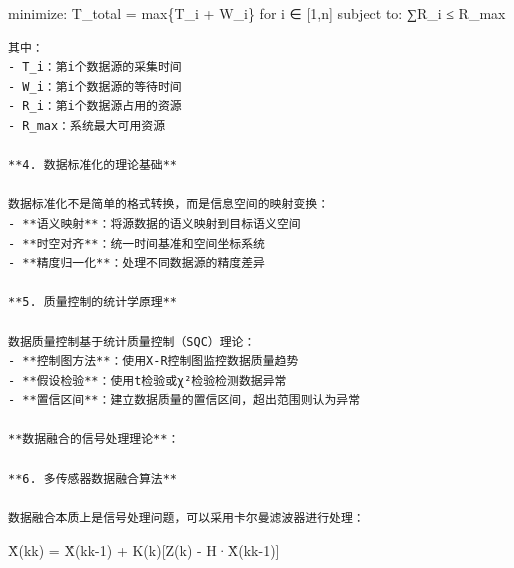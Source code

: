 minimize: T\_total = max\{T\_i + W\_i\} for i ∈ {[}1,n{]} subject to: ∑R\_i ≤ R\_max

\begin{lstlisting}
其中：
- T_i：第i个数据源的采集时间
- W_i：第i个数据源的等待时间
- R_i：第i个数据源占用的资源
- R_max：系统最大可用资源

**4. 数据标准化的理论基础**

数据标准化不是简单的格式转换，而是信息空间的映射变换：
- **语义映射**：将源数据的语义映射到目标语义空间
- **时空对齐**：统一时间基准和空间坐标系统
- **精度归一化**：处理不同数据源的精度差异

**5. 质量控制的统计学原理**

数据质量控制基于统计质量控制（SQC）理论：
- **控制图方法**：使用X-R控制图监控数据质量趋势
- **假设检验**：使用t检验或χ²检验检测数据异常
- **置信区间**：建立数据质量的置信区间，超出范围则认为异常

**数据融合的信号处理理论**：

**6. 多传感器数据融合算法**

数据融合本质上是信号处理问题，可以采用卡尔曼滤波器进行处理：
\end{lstlisting}

X̂(k\textbar k) = X̂(k\textbar k-1) + K(k){[}Z(k) - H·X̂(k\textbar k-1){]}

